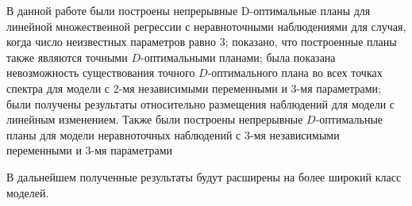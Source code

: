 В данной работе были построены непрерывные D-оптимальные планы для линейной множественной регрессии с неравноточными наблюдениями для случая, когда число неизвестных параметров равно 3; показано, что построенные планы также являются точными $D$-оптимальными планами; была показана невозможность существования точного $D$-оптимального плана во всех точках спектра для модели с 2-мя независимыми переменными и 3-мя параметрами; были получены результаты относительно размещения наблюдений для модели с линейным изменением. Также были построены непрерывные $D$-оптимальные планы для модели неравноточных наблюдений с 3-мя независимыми переменными и 3-мя параметрами

В дальнейшем полученные результаты будут расширены на более широкий класс моделей.
